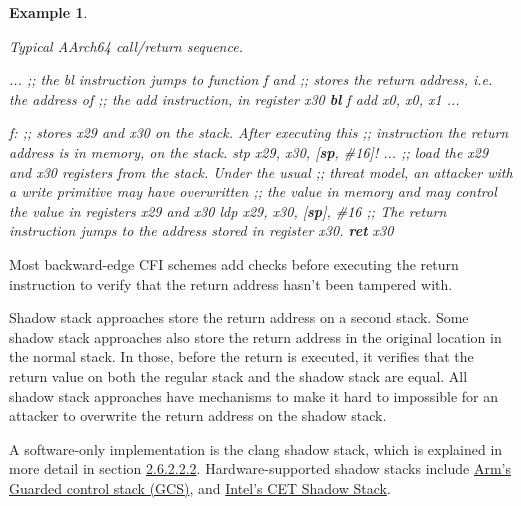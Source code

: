 \documentclass[
  a4paper,
]{report}
\newtheorem{example}{Example}
\newenvironment{Shaded}{}{}
\newcommand{\CommentTok}[1]{\textcolor[rgb]{0.38,0.63,0.69}{\textit{#1}}}
\newcommand{\FunctionTok}[1]{\textcolor[rgb]{0.02,0.16,0.49}{#1}}
\newcommand{\KeywordTok}[1]{\textcolor[rgb]{0.00,0.44,0.13}{\textbf{#1}}}
\newcommand{\NormalTok}[1]{#1}
\newcommand{\OperatorTok}[1]{\textcolor[rgb]{0.40,0.40,0.40}{#1}}
\begin{document}
\begin{example}

\label{}

\textup{Typical AArch64 call/return sequence.}

\begin{Shaded}
\begin{Highlighting}[]
\NormalTok{  ...}
  \CommentTok{;; the bl instruction jumps to function f and}
  \CommentTok{;; stores the return address, i.e. the address of}
  \CommentTok{;; the \textquotesingle{}add\textquotesingle{} instruction, in register x30}
  \KeywordTok{bl}\NormalTok{ f}
\NormalTok{  add x0}\OperatorTok{,}\NormalTok{ x0}\OperatorTok{,}\NormalTok{ x1}
\NormalTok{  ...}

\FunctionTok{f:}
  \CommentTok{;; stores x29 and x30 on the stack. After executing this}
  \CommentTok{;; instruction the return address is in memory, on the stack.}
\NormalTok{  stp x29}\OperatorTok{,}\NormalTok{ x30}\OperatorTok{,} \OperatorTok{[}\KeywordTok{sp}\OperatorTok{,} \CommentTok{\#16]!}
\NormalTok{  ...}
  \CommentTok{;; load the x29 and x30 registers from the stack. Under the usual}
  \CommentTok{;; threat model, an attacker with a write primitive may have overwritten}
  \CommentTok{;; the value in memory and may control the value in registers x29 and x30}
\NormalTok{  ldp x29}\OperatorTok{,}\NormalTok{ x30}\OperatorTok{,} \OperatorTok{[}\KeywordTok{sp}\OperatorTok{],} \CommentTok{\#16}
  \CommentTok{;; The return instruction jumps to the address stored in register x30.}
  \KeywordTok{ret}\NormalTok{ x30}
\end{Highlighting}
\end{Shaded}

\end{example}

Most backward-edge CFI schemes add checks before executing the return
instruction to verify that the return address hasn't been tampered with.

\label{__index_entry_46}{Shadow
stack} approaches store the return address on a
second stack. Some shadow stack approaches also store the return address
in the original location in the normal stack. In those, before the
return is executed, it verifies that the return value on both the
regular stack and the shadow stack are equal. All shadow stack
approaches have mechanisms to make it hard to impossible for an attacker
to overwrite the return address on the shadow stack.

A software-only implementation is the clang shadow stack, which is
explained in more detail in section
\hyperref[sec:clang-shadow-stack]{2.6.2.2.2}. Hardware-supported shadow
stacks include
\href{https://community.arm.com/arm-community-blogs/b/architectures-and-processors-blog/posts/arm-a-profile-architecture-2022}{Arm's
Guarded control stack (GCS)}, and
\href{https://www.intel.com/content/www/us/en/content-details/785687/complex-shadow-stack-updates-intel-control-flow-enforcement-technology.html}{Intel's
CET Shadow Stack}.
\end{document}
